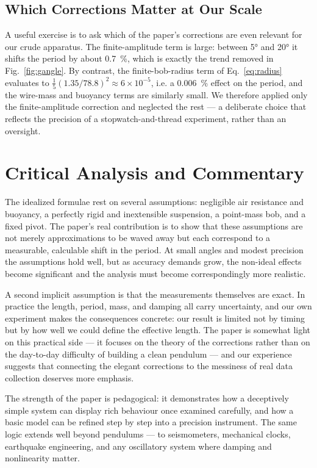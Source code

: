 \documentclass[11pt]{article}
\begin{document}
\subsection{Which Corrections Matter at Our Scale}
A useful exercise is to ask which of the paper's corrections are even relevant for our
crude apparatus. The finite-amplitude term is large: between \ang{5} and \ang{20} it
shifts the period by about \SI{0.7}{\percent}, which is exactly the trend removed in
Fig.~\ref{fig:gangle}. By contrast, the finite-bob-radius term of Eq.~\eqref{eq:radius}
evaluates to $\tfrac{1}{5}(1.35/78.8)^2 \approx 6\times10^{-5}$, i.e. a
\SI{0.006}{\percent} effect on the period, and the wire-mass and buoyancy terms are
similarly small. We therefore applied only the finite-amplitude correction and neglected
the rest --- a deliberate choice that reflects the precision of a stopwatch-and-thread
experiment, rather than an oversight.

\section{Critical Analysis and Commentary}

The idealized formulae rest on several assumptions: negligible air resistance and buoyancy,
a perfectly rigid and inextensible suspension, a point-mass bob, and a fixed pivot. The
paper's real contribution is to show that these assumptions are not merely approximations
to be waved away but each correspond to a measurable, calculable shift in the period. At
small angles and modest precision the assumptions hold well, but as accuracy demands grow,
the non-ideal effects become significant and the analysis must become correspondingly more
realistic.

A second implicit assumption is that the measurements themselves are exact. In practice the
length, period, mass, and damping all carry uncertainty, and our own experiment makes the
consequences concrete: our result is limited not by timing but by how well we could define
the effective length. The paper is somewhat light on this practical side --- it focuses on
the theory of the corrections rather than on the day-to-day difficulty of building a clean
pendulum --- and our experience suggests that connecting the elegant corrections to the
messiness of real data collection deserves more emphasis.

The strength of the paper is pedagogical: it demonstrates how a deceptively simple system
can display rich behaviour once examined carefully, and how a basic model can be refined
step by step into a precision instrument. The same logic extends well beyond pendulums ---
to seismometers, mechanical clocks, earthquake engineering, and any oscillatory system
where damping and nonlinearity matter.
\end{document}
